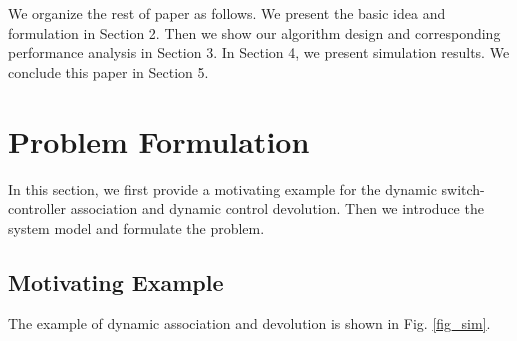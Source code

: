 \documentclass[10pt,journal,compsoc]{IEEEtran}
\begin{document}
We organize the rest of paper as follows. We present the basic idea and formulation in Section 2. Then we show our algorithm design and corresponding performance analysis in Section 3. In Section 4, we present simulation results. We conclude this paper in Section 5. 

\section{Problem Formulation}

In this section, we first provide a motivating example for the dynamic switch-controller association and dynamic control devolution. Then we introduce the system model and formulate the problem.

\subsection{Motivating Example}

The example of dynamic association and devolution is shown in Fig. \ref{fig_sim}.
\end{document}
